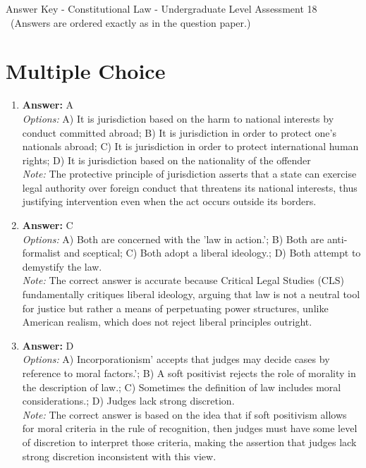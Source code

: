 \documentclass[12pt]{article}
\begin{document}
\begin{center}
Answer Key - Constitutional Law - Undergraduate Level Assessment 18 \
\small (Answers are ordered exactly as in the question paper.)
\end{center}

\section*{Multiple Choice}
\begin{enumerate}[label=\arabic*.]
\item \textbf{Answer:} A
\\ \textit{Options:} A) It is jurisdiction based on the harm to national interests by conduct committed abroad; B) It is jurisdiction in order to protect one's nationals abroad; C) It is jurisdiction in order to protect international human rights; D) It is jurisdiction based on the nationality of the offender
\\ \textit{Note:} The protective principle of jurisdiction asserts that a state can exercise legal authority over foreign conduct that threatens its national interests, thus justifying intervention even when the act occurs outside its borders.
\item \textbf{Answer:} C
\\ \textit{Options:} A) Both are concerned with the 'law in action.'; B) Both are anti-formalist and sceptical; C) Both adopt a liberal ideology.; D) Both attempt to demystify the law.
\\ \textit{Note:} The correct answer is accurate because Critical Legal Studies (CLS) fundamentally critiques liberal ideology, arguing that law is not a neutral tool for justice but rather a means of perpetuating power structures, unlike American realism, which does not reject liberal principles outright.
\item \textbf{Answer:} D
\\ \textit{Options:} A) Incorporationism' accepts that judges may decide cases by reference to moral factors.'; B) A soft positivist rejects the role of morality in the description of law.; C) Sometimes the definition of law includes moral considerations.; D) Judges lack strong discretion.
\\ \textit{Note:} The correct answer is based on the idea that if soft positivism allows for moral criteria in the rule of recognition, then judges must have some level of discretion to interpret those criteria, making the assertion that judges lack strong discretion inconsistent with this view.

\end{enumerate}
\end{document}
